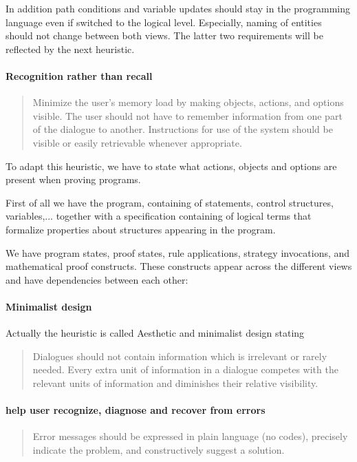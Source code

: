 \documentclass{article}
\begin{document}
In addition path conditions and variable updates should stay in the programming 
language even if switched to the logical level. Especially, naming of entities 
should not change between both views. The latter two requirements will be 
reflected by the next heuristic.
\paragraph{Recognition rather than recall}
\begin{quote}
 Minimize the user's memory load by making objects, actions, and options 
visible. The user should not have to remember information from one part of the 
dialogue to another. Instructions for use of the system should be visible or 
easily retrievable whenever appropriate.
\end{quote}

To adapt this heuristic, we have to state what actions, objects and options are 
present when proving programs.

First of all we have the program, containing of statements, control structures, 
variables,... together with a specification containing of logical terms that 
formalize properties about structures appearing in the program.

We have program states, proof states, rule applications, strategy invocations, 
and mathematical proof constructs.
These constructs appear across the different views and have dependencies 
between each other:


\paragraph{Minimalist design}
Actually the heuristic is called Aesthetic and minimalist design stating 
\begin{quote}
 Dialogues should not contain information which is irrelevant or rarely needed. 
Every extra unit of information in a dialogue competes with the relevant units 
of information and diminishes their relative visibility.
\end{quote}

\paragraph{help user recognize, diagnose and recover from errors}
\begin{quote}
 Error messages should be expressed in plain language (no codes), precisely 
indicate the problem, and constructively suggest a solution.
\end{quote}
\end{document}
